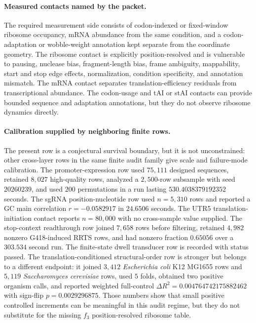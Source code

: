 \paragraph{Measured contacts named by the packet.}
The required measurement side consists of codon-indexed or fixed-window ribosome occupancy, mRNA abundance from the same condition, and a codon-adaptation or wobble-weight annotation kept separate from the coordinate geometry.  The ribosome contact is explicitly position-resolved and is vulnerable to pausing, nuclease bias, fragment-length bias, frame ambiguity, mappability, start and stop edge effects, normalization, condition specificity, and annotation mismatch.  The mRNA contact separates translation-efficiency residuals from transcriptional abundance.  The codon-usage and tAI or stAI contacts can provide bounded sequence and adaptation annotations, but they do not observe ribosome dynamics directly.

\paragraph{Calibration supplied by neighboring finite rows.}
The present row is a conjectural survival boundary, but it is not unconstrained: other cross-layer rows in the same finite audit family give scale and failure-mode calibration.  The promoter-expression row used $75{,}111$ designed sequences, retained $8{,}027$ high-quality rows, analyzed a $2{,}500$-row subsample with seed $20260239$, and used $200$ permutations in a run lasting $530.4038379192352$ seconds.  The sgRNA position-nucleotide row used $n=5{,}310$ rows and reported a GC main correlation $r=-0.0582917$ in $24.6506$ seconds.  The UTR5 translation-initiation contact reports $n=80{,}000$ with no cross-sample value supplied.  The stop-context readthrough row joined $7{,}658$ rows before filtering, retained $4{,}982$ nonzero G418-induced RRTS rows, and had nonzero fraction $0.65056$ over a $303.534$ second run.  The finite-state dwell transducer row is recorded with status passed.  The translation-conditioned structural-order row is stronger but belongs to a different endpoint: it joined $3{,}412$ \emph{Escherichia coli} K12 MG1655 rows and $5{,}119$ \emph{Saccharomyces cerevisiae} rows, used $5$ folds, obtained two positive organism calls, and reported weighted full-control $\Delta R^2=0.004764742175882462$ with sign-flip $p=0.0029296875$.  Those numbers show that small positive controlled increments can be meaningful in this audit regime, but they do not substitute for the missing $f_3$ position-resolved ribosome table.

